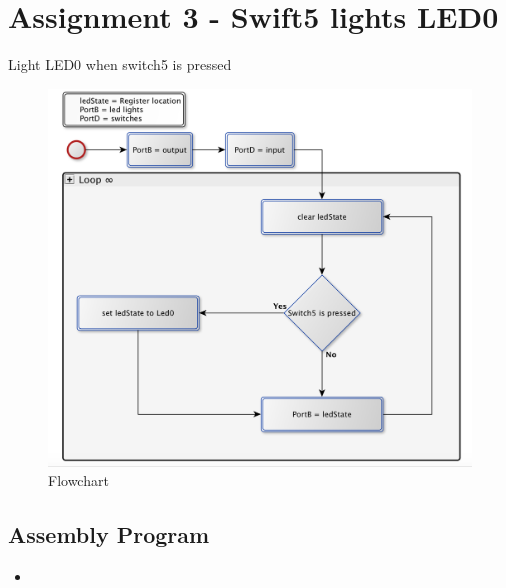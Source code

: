 \documentclass[a4paper, 12pt]{article}
\newcommand{\avrasm}[2]{
\begin{itemize}
\item[]
\end{itemize}
}
\begin{document}
\section{Assignment 3 - Swift5 lights LED0}



\begin{algorithm}
\begin{algorithmic}
\Repeat
{} 
\EndIf
{}
\Until{$\infty$}
\EndProcedure
\caption{Light LED0 when switch5 is pressed}
\label{assign2.pseudo}
\end{algorithmic}
\end{algorithm}

\begin{figure}[h]
\includegraphics[scale=0.5]{Flowchart_pics/assignment3_pic.png} 
\caption{Flowchart}
\label{}
\end{figure}
\newpage



\subsection{Assembly Program}
\avrasm{../src/a3.asm}{}
\newpage
\end{document}

